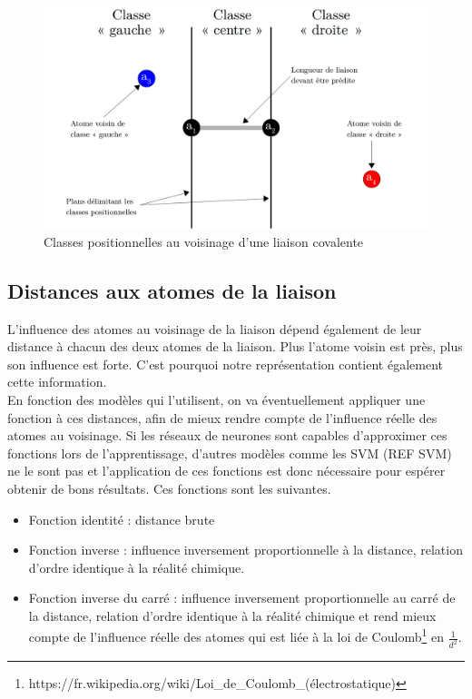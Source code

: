 \vspace{1cm}

\begin{figure}[!h]
	\centering
	\includegraphics[scale=0.27]{images/classes_pos.png}
	\caption{Classes positionnelles au voisinage d'une liaison covalente}
\end{figure}

\subsection{Distances aux atomes de la liaison}
\par L'influence des atomes au voisinage de la liaison dépend également de leur distance à chacun des deux atomes de la liaison. Plus l'atome voisin est près, plus son influence est forte. C'est pourquoi notre représentation contient également cette information. \\
En fonction des modèles qui l'utilisent, on va éventuellement appliquer une fonction à ces distances, afin de mieux rendre compte de l'influence réelle des atomes au voisinage. Si les réseaux de neurones sont capables d'approximer ces fonctions lors de l'apprentissage, d'autres modèles comme les SVM (REF SVM) ne le sont pas et l'application de ces fonctions est donc nécessaire pour espérer obtenir de bons résultats. Ces fonctions sont les suivantes.\\

\begin{itemize}
\item{Fonction identité : distance brute}
\item{Fonction inverse : influence inversement proportionnelle à la distance, relation d'ordre identique à la réalité chimique.}
\item{Fonction inverse du carré : influence inversement proportionnelle au carré de la distance, relation d'ordre identique à la réalité chimique et rend mieux compte de l'influence réelle des atomes qui est liée à la loi de Coulomb\footnote{https://fr.wikipedia.org/wiki/Loi\_de\_Coulomb\_(électrostatique)} en $\frac{1}{d^2}$.}
\end{itemize}

